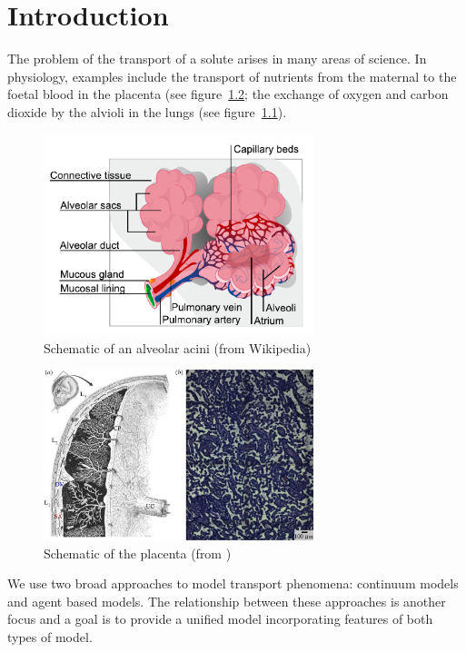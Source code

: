 \chapter{Introduction}
The problem of the transport of a solute arises in many areas of science. In
physiology, examples include the transport of nutrients from the maternal to the
foetal blood in the placenta (see figure~\ref{fig:placenta}; the exchange of oxygen
and carbon dioxide by the alvioli in the lungs (see figure~\ref{fig:alveolus}).

\begin{figure}[ht!]
    \centering
    \includegraphics[width=0.7\textwidth]{introduction/figures/alveolus}
    \caption{\label{fig:alveolus}Schematic of an alveolar acini (from Wikipedia)}
\end{figure}
\begin{figure}[ht!]
    \centering
    \includegraphics[width=0.7\textwidth]{introduction/figures/placentarast}
    \caption{\label{fig:placenta}Schematic of the placenta (from \cite{asdf})}
\end{figure}


We use two broad approaches to model transport phenomena: continuum models and
agent based models. The relationship between these approaches is another focus
and a goal is to provide a unified model incorporating features of both types of
model.


